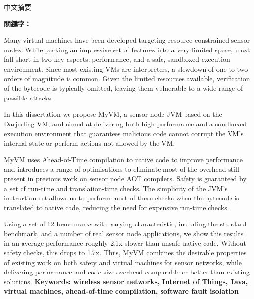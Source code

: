 \begin{abstractzh}
中文摘要

\bigbreak
\noindent \textbf{關鍵字：}{\, \makeatletter \@keywordszh \makeatother}
\end{abstractzh}

\begin{abstracten}
Many virtual machines have been developed targeting resource-constrained sensor nodes. While packing an impressive set of features into a very limited space, most fall short in two key aspects: performance, and a safe, sandboxed execution environment. Since most existing VMs are interpreters, a slowdown of one to two orders of magnitude is common. Given the limited resources available, verification of the bytecode is typically omitted, leaving them vulnerable to a wide range of possible attacks.

In this dissertation we propose MyVM, a sensor node JVM based on the Darjeeling VM, and aimed at delivering both high performance and a sandboxed execution environment that guarantees malicious code cannot corrupt the VM's internal state or perform actions not allowed by the VM.

MyVM uses Ahead-of-Time compilation to native code to improve performance and introduces a range of optimisations to eliminate most of the overhead still present in previous work on sensor node AOT compilers. Safety is guaranteed by a set of run-time and translation-time checks. The simplicity of the JVM's instruction set allows us to perform most of these checks when the bytecode is translated to native code, reducing the need for expensive run-time checks.

Using a set of 12 benchmarks with varying characteristic, including the standard  benchmark, and a number of real sensor node applications, we show this results in an average performance roughly 2.1x slower than unsafe native code. Without safety checks, this drops to 1.7x. Thus, MyVM combines the desirable properties of existing work on both safety and virtual machines for sensor networks, while delivering performance and code size overhead comparable or better than existing solutions.
\bigbreak
\noindent \textbf{Keywords: wireless sensor networks, Internet of Things, Java, virtual machines, ahead-of-time compilation, software fault isolation}{\, \makeatletter \@keywordsen \makeatother}
\end{abstracten}

\begin{comment}


\end{comment}
